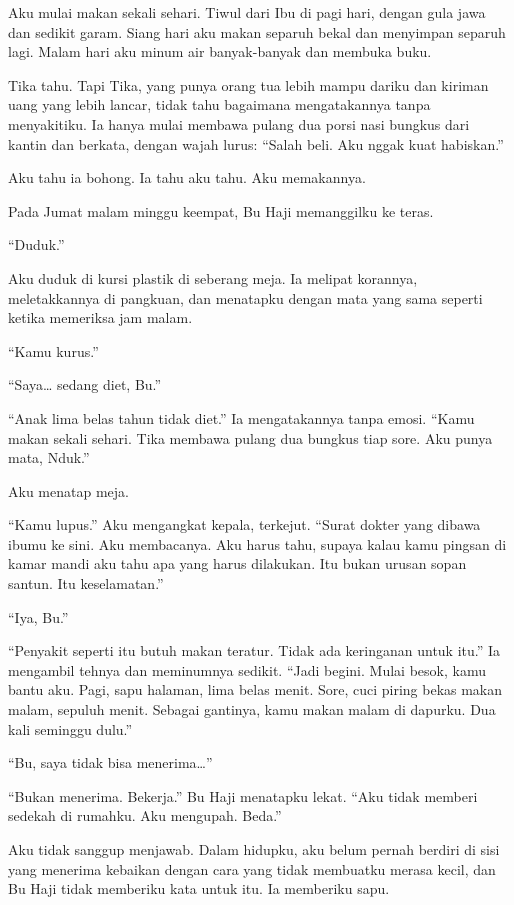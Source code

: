 \documentclass[11pt,twoside,openany]{book}
\begin{document}
Aku mulai makan sekali sehari. Tiwul dari Ibu di pagi hari, dengan gula jawa dan sedikit garam. Siang hari aku makan separuh bekal dan menyimpan separuh lagi. Malam hari aku minum air banyak-banyak dan membuka buku.

Tika tahu. Tapi Tika, yang punya orang tua lebih mampu dariku dan kiriman uang yang lebih lancar, tidak tahu bagaimana mengatakannya tanpa menyakitiku. Ia hanya mulai membawa pulang dua porsi nasi bungkus dari kantin dan berkata, dengan wajah lurus: ``Salah beli. Aku nggak kuat habiskan.''

Aku tahu ia bohong. Ia tahu aku tahu. Aku memakannya.

Pada Jumat malam minggu keempat, Bu Haji memanggilku ke teras.

``Duduk.''

Aku duduk di kursi plastik di seberang meja. Ia melipat korannya, meletakkannya di pangkuan, dan menatapku dengan mata yang sama seperti ketika memeriksa jam malam.

``Kamu kurus.''

``Saya\ldots{} sedang diet, Bu.''

``Anak lima belas tahun tidak diet.'' Ia mengatakannya tanpa emosi. ``Kamu makan sekali sehari. Tika membawa pulang dua bungkus tiap sore. Aku punya mata, Nduk.''

Aku menatap meja.

``Kamu lupus.'' Aku mengangkat kepala, terkejut. ``Surat dokter yang dibawa ibumu ke sini. Aku membacanya. Aku harus tahu, supaya kalau kamu pingsan di kamar mandi aku tahu apa yang harus dilakukan. Itu bukan urusan sopan santun. Itu keselamatan.''

``Iya, Bu.''

``Penyakit seperti itu butuh makan teratur. Tidak ada keringanan untuk itu.'' Ia mengambil tehnya dan meminumnya sedikit. ``Jadi begini. Mulai besok, kamu bantu aku. Pagi, sapu halaman, lima belas menit. Sore, cuci piring bekas makan malam, sepuluh menit. Sebagai gantinya, kamu makan malam di dapurku. Dua kali seminggu dulu.''

``Bu, saya tidak bisa menerima\ldots{}''

``Bukan menerima. Bekerja.'' Bu Haji menatapku lekat. ``Aku tidak memberi sedekah di rumahku. Aku mengupah. Beda.''

Aku tidak sanggup menjawab. Dalam hidupku, aku belum pernah berdiri di sisi yang menerima kebaikan dengan cara yang tidak membuatku merasa kecil, dan Bu Haji tidak memberiku kata untuk itu. Ia memberiku sapu.
\end{document}
